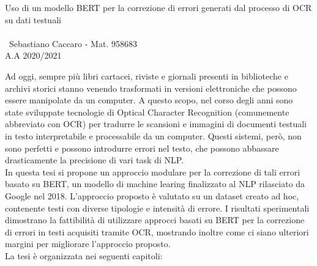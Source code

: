 \documentclass[12pt]{article}
\begin{document}
\begin{center}
 {\Large Uso di un modello BERT per la correzione di errori generati dal processo di OCR su dati testuali}\\ \
\\ \ 
{\large Sebastiano Caccaro - Mat. 958683}\\
A.A 2020/2021
\end{center}


\newcommand{\E}{È}

Ad oggi, sempre più libri cartacei, riviste e giornali presenti in biblioteche e archivi storici stanno venendo trasformati in versioni elettroniche che possono essere manipolate da un computer. A questo scopo, nel corso degli anni sono state sviluppate tecnologie di Optical Character Recognition (comunemente abbreviato con OCR) per tradurre le scansioni e immagini di documenti testuali in testo interpretabile e processabile da un computer. Questi sistemi, però, non sono perfetti e possono introdurre errori nel testo, che possono abbassare drasticamente la precisione di vari task di NLP.\\
In questa tesi si propone un approccio modulare per la correzione di tali errori basato su BERT, un modello di machine learing finalizzato al NLP rilasciato da Google nel 2018.
L'approccio proposto è valutato su un dataset creato ad hoc, contenente testi con diverse tipologie e intensità di errore.  
I risultati sperimentali dimostrano la fattibilità di utilizzare approcci basati su BERT per la correzione di errori in testi acquisiti tramite OCR, mostrando inoltre come ci siano ulteriori margini per migliorare l'approccio proposto.\\
\noindent
La tesi è organizzata nei seguenti capitoli:
\end{document}
